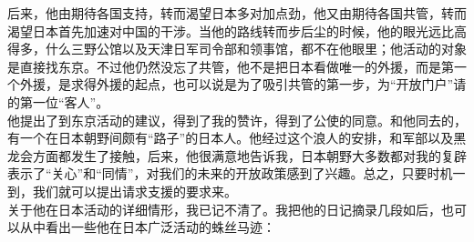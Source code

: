 后来，他由期待各国支持，转而渴望日本多对加点劲，他又由期待各国共管，转而渴望日本首先加速对中国的干涉。当他的路线转而步后尘的时候，他的眼光远比高得多，什么三野公馆以及天津日军司令部和领事馆，都不在他眼里；他活动的对象是直接找东京。不过他仍然没忘了共管，他不是把日本看做唯一的外援，而是第一个外援，是求得外援的起点，也可以说是为了吸引共管的第一步，为“开放门户”请的第一位“客人”。\\

他提出了到东京活动的建议，得到了我的赞许，得到了公使的同意。和他同去的，有一个在日本朝野间颇有“路子”的日本人。他经过这个浪人的安排，和军部以及黑龙会方面都发生了接触，后来，他很满意地告诉我，日本朝野大多数都对我的复辟表示了“关心”和“同情”，对我们的未来的开放政策感到了兴趣。总之，只要时机一到，我们就可以提出请求支援的要求来。\\

关于他在日本活动的详细情形，我已记不清了。我把他的日记摘录几段如后，也可以从中看出一些他在日本广泛活动的蛛丝马迹：\\

